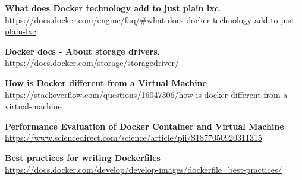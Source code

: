 \documentclass[a4paper,10pt]{memoir}
\begin{document}
\begin{thebibliography}{9}
  \textbf{What does Docker technology add to just plain lxc}.\\
  \href{https://docs.docker.com/engine/faq/#what-does-docker-technology-add-to-just-plain-lxc}{https://docs.docker.com/engine/faq/\#what-does-docker-technology-add-to-just-plain-lxc}

  \textbf{Docker docs - About storage drivers}.\\
  \href{https://docs.docker.com/storage/storagedriver/}{https://docs.docker.com/storage/storagedriver/}

    \textbf{How is Docker different from a Virtual Machine}
    \\
    \href{https://stackoverflow.com/questions/16047306/how-is-docker-different-from-a-virtual-machine}{https://stackoverflow.com/questions/16047306/how-is-docker-different-from-a-virtual-machine}

    \textbf{Performance Evaluation of Docker Container and Virtual Machine}
    \\
    \href{https://www.sciencedirect.com/science/article/pii/S1877050920311315}{https://www.sciencedirect.com/science/article/pii/S1877050920311315}

    \textbf{Best practices for writing Dockerfiles}
    \\
    \href{https://docs.docker.com/develop/develop-images/dockerfile_best-practices/}{https://docs.docker.com/develop/develop-images/dockerfile\_best-practices/}

\end{thebibliography}
\end{document}
